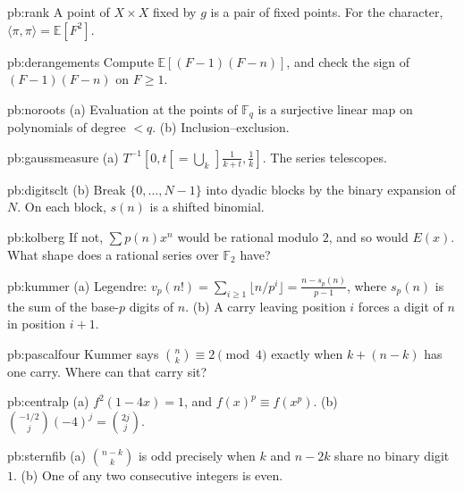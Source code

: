 \begin{hint}{pb:rank}
A point of $X\times X$ fixed by $g$ is a pair of fixed points. For the character, $\langle\pi,\pi\rangle=\mathbb E[F^2]$.
\end{hint}

\begin{hint}{pb:derangements}
Compute $\mathbb E[(F-1)(F-n)]$, and check the sign of $(F-1)(F-n)$ on $F\ge1$.
\end{hint}

\begin{hint}{pb:noroots}
(a) Evaluation at the points of $\mathbb F_q$ is a surjective linear map on polynomials of degree $<q$. (b) Inclusion--exclusion.
\end{hint}

\begin{hint}{pb:gaussmeasure}
(a) $T^{-1}[0,t[=\bigcup_k\,]\frac1{k+t},\frac1k]$. The series telescopes.
\end{hint}

\begin{hint}{pb:digitsclt}
(b) Break $\{0,\dots,N-1\}$ into dyadic blocks by the binary expansion of $N$. On each block, $s(n)$ is a shifted
binomial.
\end{hint}

\begin{hint}{pb:kolberg}
If not, $\sum p(n)x^n$ would be rational modulo $2$, and so would $E(x)$. What shape does a rational series over $\mathbb F_2$
have?
\end{hint}

\begin{hint}{pb:kummer}
(a) Legendre: $v_p(n!)=\sum_{i\ge1}\lfloor n/p^i\rfloor=\frac{n-s_p(n)}{p-1}$, where $s_p(n)$ is the sum of the base-$p$ digits of $n$. (b) A carry leaving position $i$ forces a digit of $n$ in position $i+1$.
\end{hint}

\begin{hint}{pb:pascalfour}
Kummer says $\binom nk\equiv2\pmod4$ exactly when $k+(n-k)$ has one carry. Where can that carry sit?
\end{hint}

\begin{hint}{pb:centralp}
(a) $f^2(1-4x)=1$, and $f(x)^p\equiv f(x^p)$. (b) $\binom{-1/2}j(-4)^j=\binom{2j}j$.
\end{hint}

\begin{hint}{pb:sternfib}
(a) $\binom{n-k}k$ is odd precisely when $k$ and $n-2k$ share no binary digit $1$. (b) One of any two consecutive integers is
even.
\end{hint}

